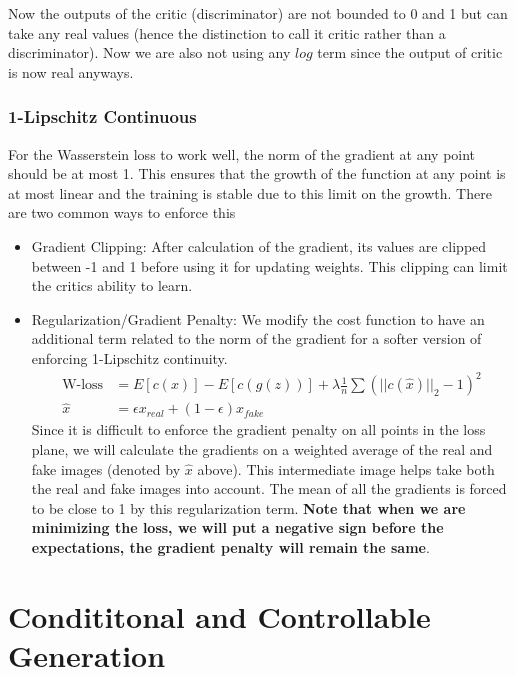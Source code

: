 \documentclass[../gan.tex]{subfiles}
\begin{document}
Now the outputs of the critic (discriminator) are not bounded to 0 and 1 but can take any real values (hence the distinction to call it critic rather than a discriminator). Now we are also not using any $log$ term since the output of critic is now real anyways.

\subsubsection{1-Lipschitz Continuous}
For the Wasserstein loss to work well, the norm of the gradient at any point should be at most 1. This ensures that the growth of the function at any point is at most linear and the training is stable due to this limit on the growth. There are two common ways to enforce this
\begin{itemize}
    \item Gradient Clipping: After calculation of the gradient, its values are clipped between -1 and 1 before using it for updating weights. This clipping can limit the critics ability to learn.
    \item Regularization/Gradient Penalty: We modify the cost function to have an additional term related to the norm of the gradient for a softer version of enforcing 1-Lipschitz continuity.
    \begin{align*}
        \text{W-loss} &= E[c(x)] - E[c(g(z))] + \lambda\frac{1}{n}\sum(\lvert\lvert c(\hat{x}) \rvert\rvert_{2} - 1)^{2}\\
        \hat{x} &= \epsilon x_{real} + (1-\epsilon) x_{fake}
    \end{align*}
    Since it is difficult to enforce the gradient penalty on all points in the loss plane, we will calculate the gradients on a weighted average of the real and fake images (denoted by $\hat{x}$ above). This intermediate image helps take both the real and fake images into account. The mean of all the gradients is forced to be close to 1 by this regularization term. \textbf{Note that when we are minimizing the loss, we will put a negative sign before the expectations, the gradient penalty will remain the same}.
\end{itemize}

\section{Condititonal and Controllable Generation}
\end{document}

